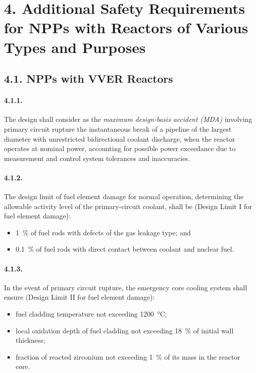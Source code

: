 \documentclass[openright]{bookest}
\begin{document}
\section*{4. Additional Safety Requirements for NPPs with Reactors of Various Types and Purposes}

\subsection*{4.1. NPPs with VVER Reactors}

\paragraph{4.1.1.}
The design shall consider as the \textit{maximum design-basis accident (MDA)} involving primary circuit rupture the instantaneous break of a pipeline of the largest diameter with unrestricted bidirectional coolant discharge, when the reactor operates at nominal power, accounting for possible power exceedance due to measurement and control system tolerances and inaccuracies.

\paragraph{4.1.2.}
The design limit of fuel element damage for normal operation, determining the allowable activity level of the primary-circuit coolant, shall be (Design Limit I for fuel element damage):
\begin{itemize}
    \item \qty{1}{\percent} of fuel rods with defects of the gas leakage type; and
    \item \qty{0.1}{\percent} of fuel rods with direct contact between coolant and nuclear fuel.
\end{itemize}

\paragraph{4.1.3.}
In the event of primary circuit rupture, the emergency core cooling system shall ensure (Design Limit II for fuel element damage):
\begin{itemize}
    \item fuel cladding temperature not exceeding \qty{1200}{\celsius};
    \item local oxidation depth of fuel cladding not exceeding \qty{18}{\percent} of initial wall thickness;
    \item fraction of reacted zirconium not exceeding \qty{1}{\percent} of its mass in the reactor core.
\end{itemize}
\end{document}
